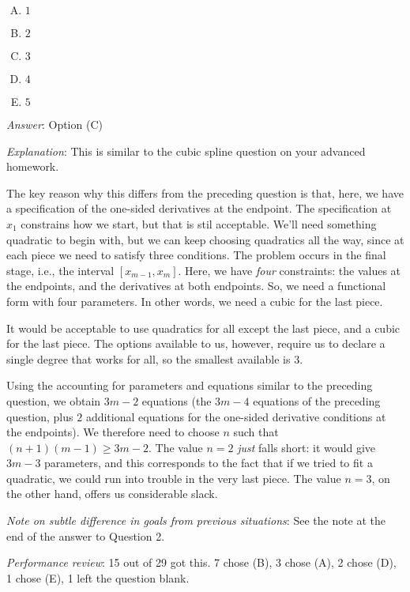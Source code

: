 \documentclass[10pt]{amsart}
\begin{document}
\begin{enumerate}
  \begin{enumerate}[(A)]
  \item $1$
  \item $2$
  \item $3$
  \item $4$
  \item $5$
  \end{enumerate}

  {\em Answer}: Option (C)

  {\em Explanation}: This is similar to the cubic spline question on
  your advanced homework.

  The key reason why this differs from the preceding question is that,
  here, we have a specification of the one-sided derivatives at the
  endpoint. The specification at $x_1$ constrains how we start, but
  that is stil acceptable. We'll need something quadratic to begin
  with, but we can keep choosing quadratics all the way, since at each
  piece we need to satisfy three conditions. The problem occurs in the
  final stage, i.e., the interval $[x_{m-1},x_m]$. Here, we have {\em
    four} constraints: the values at the endpoints, and the
  derivatives at both endpoints. So, we need a functional form with
  four parameters. In other words, we need a cubic for the last piece.

  It would be acceptable to use quadratics for all except the last
  piece, and a cubic for the last piece. The options available to us,
  however, require us to declare a single degree that works for all,
  so the smallest available is $3$.

  Using the accounting for parameters and equations similar to the
  preceding question, we obtain $3m - 2$ equations (the $3m - 4$
  equations of the preceding question, plus $2$ additional equations
  for the one-sided derivative conditions at the endpoints). We
  therefore need to choose $n$ such that $(n + 1)(m - 1) \ge 3m -
  2$. The value $n = 2$ {\em just} falls short: it would give $3m -3$
  parameters, and this corresponds to the fact that if we tried to fit
  a quadratic, we could run into trouble in the very last piece. The
  value $n = 3$, on the other hand, offers us considerable slack.

  {\em Note on subtle difference in goals from previous situations}:
  See the note at the end of the answer to Question 2.

  {\em Performance review}: 15 out of 29 got this. 7 chose (B), 3
  chose (A), 2 chose (D), 1 chose (E), 1 left the question blank.


\end{enumerate}
\end{document}
